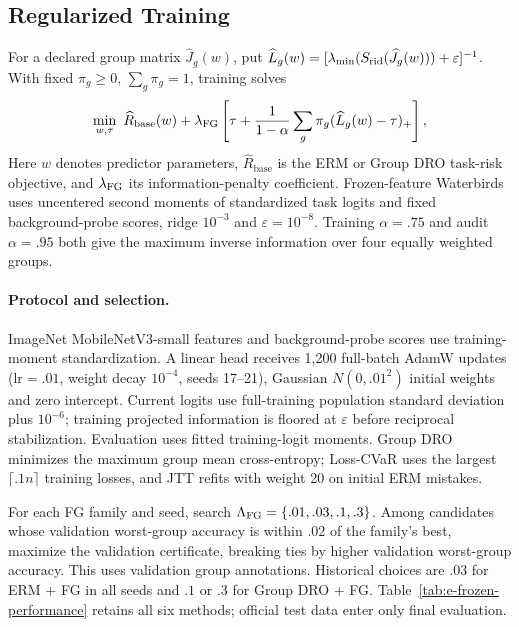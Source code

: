 \subsection{Regularized Training}
\label{app:regularized-training}

For a declared group matrix $\widehat J_g(w)$, put $\widehat L_g(w)=[\lambda_{\min}(S_{\mathrm{rid}}(\widehat J_g(w)))+\varepsilon]^{-1}$. With fixed $\pi_g\ge0$, $\sum_g\pi_g=1$, training solves
\begin{equation}
\min_{w,\tau}\ \widehat R_{\mathrm{base}}(w)+\lambda_{\mathrm{FG}}
\left[\tau+\frac{1}{1-\alpha}\sum_g\pi_g(\widehat L_g(w)-\tau)_+\right],
\label{eq:fisher-glass-training-objective}
\end{equation}
Here $w$ denotes predictor parameters, $\widehat R_{\mathrm{base}}$ is the ERM or Group DRO task-risk objective, and $\lambda_{\mathrm{FG}}$ its information-penalty coefficient. Frozen-feature Waterbirds uses uncentered second moments of standardized task logits and fixed background-probe scores, ridge $10^{-3}$ and $\varepsilon=10^{-8}$. Training $\alpha=.75$ and audit $\alpha=.95$ both give the maximum inverse information over four equally weighted groups.

\paragraph{Protocol and selection.}
ImageNet MobileNetV3-small features and background-probe scores use training-moment standardization. A linear head receives 1,200 full-batch AdamW updates ($\mathrm{lr}=.01$, weight decay $10^{-4}$, seeds 17--21), Gaussian $N(0,.01^2)$ initial weights and zero intercept. Current logits use full-training population standard deviation plus $10^{-6}$; training projected information is floored at $\varepsilon$ before reciprocal stabilization. Evaluation uses fitted training-logit moments. Group DRO minimizes the maximum group mean cross-entropy; Loss-CVaR uses the largest $\lceil.1n\rceil$ training losses, and JTT refits with weight 20 on initial ERM mistakes.

For each FG family and seed, search $\Lambda_{\mathrm{FG}}=\{.01,.03,.1,.3\}$. Among candidates whose validation worst-group accuracy is within $.02$ of the family's best, maximize the validation certificate, breaking ties by higher validation worst-group accuracy. This uses validation group annotations. Historical choices are $.03$ for ERM + FG in all seeds and $.1$ or $.3$ for Group DRO + FG. Table~\ref{tab:e-frozen-performance} retains all six methods; official test data enter only final evaluation.

